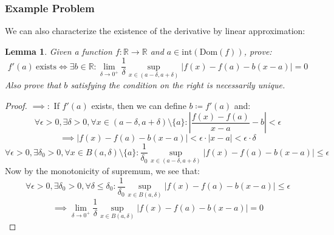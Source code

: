 \documentclass[10pt,letterpaper]{article} %
\newtheorem{lem}{Lemma}[section]
\begin{document}
\medskip
\subsubsection{Example Problem}
We can also characterize the existence of the derivative by linear approximation:
\begin{lem}
Given a function $f: \mathbb{R} \xrightarrow{} \mathbb{R}$ and $a \in \text{int}(\text{Dom}(f))$, prove:
\begin{equation*}
f'(a) \ \text{exists} \iff \exists b \in \mathbb{R}: \lim_{\delta \xrightarrow{} 0^+}\frac{1}{\delta}\sup_{x \in (a-\delta, a+\delta)}|f(x) - f(a) - b(x-a)| = 0
\end{equation*}
Also prove that $b$ satisfying the condition on the right is necessarily unique.
\end{lem}
\begin{proof}
$\implies:$ If $f'(a)$ exists, then we can define $b \coloneq f'(a)$ and:
\begin{equation*}
\forall \epsilon > 0, \exists \delta > 0, \forall x \in (a-\delta, a+\delta)\setminus\{a\}: \left|\frac{f(x) - f(a)}{x-a} - b\right| < \epsilon
\end{equation*}
\begin{equation*}
\implies |f(x) - f(a) - b(x-a)| < \epsilon \cdot |x-a| < \epsilon \cdot \delta
\end{equation*}
\begin{equation*}
\forall \epsilon > 0, \exists \delta_0 > 0, \forall x \in B(a, \delta)\setminus\{a\}: \frac{1}{\delta_0}\sup_{x \in (a - \delta, a + \delta)}|f(x) - f(a) - b(x-a)| \leqslant \epsilon
\end{equation*}
Now by the monotonicity of supremum, we see that:
\begin{equation*}
\forall \epsilon > 0, \exists \delta_0 > 0, \forall \delta \leqslant \delta_0: \frac{1}{\delta_0} \sup_{x \in B(a, \delta)}|f(x) - f(a) - b(x-a)| \leqslant \epsilon
\end{equation*}
\begin{equation*}
\implies \lim_{\delta \xrightarrow{} 0^+}\frac{1}{\delta}\sup_{x \in B(a, \delta)}|f(x) - f(a) - b(x-a)| = 0
\end{equation*}


\end{proof}
\end{document}
